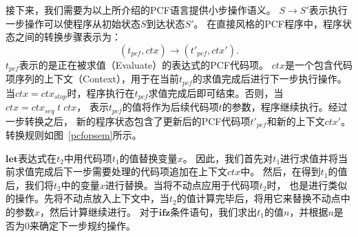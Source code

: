 接下来，我们需要为以上所介绍的PCF语言提供小步操作语义。
$S\rightarrow S'$表示执行一步操作可以使程序从初始状态$S$到达状态$S'$。
在直接风格的PCF程序中，程序状态之间的转换步骤表示为：
\begin{equation}
(t_{pcf},ctx)\rightarrow (t'_{pcf},ctx').
\end{equation}
$t_{pcf}$表示的是正在被求值（Evaluate）的表达式的PCF代码项。
$ctx$是一个包含代码项序列的上下文（Context），用于在当前$t_{pcf}$的求值完成后进行下一步执行操作。
当$ctx = ctx_{stop}$时，程序执行在$t_{pcf}$求值完成后即可结束。否则，当$ctx = ctx_{seq}\; t\; ctx$，
表示$t_{pcf}$的值将作为后续代码项$t$的参数，程序继续执行。经过一步转换之后，
新的程序状态包含了更新后的PCF代码项$t'_{pcf}$和新的上下文$ctx'$。转换规则如图~\ref{pcfopsem}所示。

$\mathbf{let}$表达式在$t_2$中用代码项$t_1$的值替换变量$x$。
因此，我们首先对$t_1$进行求值并将当前求值完成后下一步需要处理的代码项追加在上下文$ctx$中。
然后，在得到$t_1$的值后，我们将$t_2$中的变量$x$进行替换。当将不动点应用于代码项$t_2$时，
也是进行类似的操作。先将不动点放入上下文中，当$t_2$的值计算完毕后，将用它来替换不动点中的参数$x$，然后计算继续进行。
对于$\mathbf{ifz}$条件语句，我们求出$t_1$的值$n$，并根据$n$是否为0来确定下一步规约操作。

